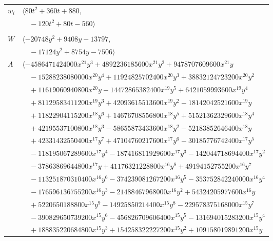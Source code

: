 \documentclass[11pt]{article}
\begin{document}
\begin{longtable}{@{}ll@{}}
$w_i$ & $\langle 80t^{2}+360t+880,$\\
 & $\quad -120t^{2}+80t-560\rangle$\\
\addlinespace[2pt]
\multicolumn{2}{@{}p{0.97\textwidth}@{}}{$i=10$, $D_i=256$, $\rho_{ij}$: $0{:}1, \allowbreak 3{:}1, \allowbreak 12{:}2, \allowbreak 14{:}2, \allowbreak 17{:}2, \allowbreak 20{:}2, \allowbreak 22{:}1, \allowbreak 24{:}2, \allowbreak 29{:}2, \allowbreak 30{:}2, \allowbreak 32{:}1, \allowbreak 33{:}2, \allowbreak 35{:}1, \allowbreak 42{:}1, \allowbreak 43{:}2, \allowbreak 44{:}2, \allowbreak 47{:}1$}\\
$W$ & $\langle -20748y^{2}+9408y-13797,$\\
 & $\quad -17124y^{2}+8754y-7506\rangle$\\
$A$ & $\langle -4586471424000x^{21}y^{3}+4892236185600x^{21}y^{2}+9478707609600x^{21}y$\\
 & $\quad -15288238080000x^{20}y^{4}+11924825702400x^{20}y^{3}+38832124723200x^{20}y^{2}$\\
 & $\quad +11619060940800x^{20}y-14472865382400x^{19}y^{5}+6421059993600x^{19}y^{4}$\\
 & $\quad +81129583411200x^{19}y^{3}+42093615513600x^{19}y^{2}-18142042521600x^{19}y$\\
 & $\quad +11822904115200x^{18}y^{6}+14676708556800x^{18}y^{5}+51521362329600x^{18}y^{4}$\\
 & $\quad +42195537100800x^{18}y^{3}-58655873433600x^{18}y^{2}-52183852646400x^{18}y$\\
 & $\quad +42331432550400x^{17}y^{7}+47104760217600x^{17}y^{6}-30185776742400x^{17}y^{5}$\\
 & $\quad -118195067289600x^{17}y^{4}-187416811929600x^{17}y^{3}-142044718694400x^{17}y^{2}$\\
 & $\quad -37863869644800x^{17}y+41176321228800x^{16}y^{8}+49194152755200x^{16}y^{7}$\\
 & $\quad -113251870310400x^{16}y^{6}-374239081267200x^{16}y^{5}-353752842240000x^{16}y^{4}$\\
 & $\quad -176596136755200x^{16}y^{3}-21488467968000x^{16}y^{2}+54324205977600x^{16}y$\\
 & $\quad +5220650188800x^{15}y^{9}-14925850214400x^{15}y^{8}-229578375168000x^{15}y^{7}$\\
 & $\quad -390829650739200x^{15}y^{6}-456826709606400x^{15}y^{5}-131694015283200x^{15}y^{4}$\\
 & $\quad +188835220684800x^{15}y^{3}+154258322227200x^{15}y^{2}+109158019891200x^{15}y$\\

\end{longtable}
\end{document}
